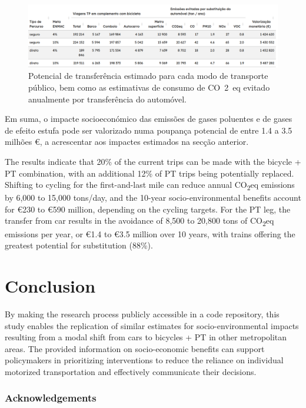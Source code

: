 \documentclass[runningheads]{llncs}
\begin{document}
\begin{figure}
\includegraphics[width=1\linewidth,]{img/table2} \caption{Potencial de transferência estimado para cada modo de transporte público, bem como as estimativas de consumo de CO~2~eq evitado anualmente por transferência do automóvel.}\label{fig:summary2}
\end{figure}

Em suma, o impacte socioeconómico das emissões de gases poluentes e de
gases de efeito estufa pode ser valorizado numa poupança potencial de
entre 1.4 a 3.5 milhões €, a acrescentar aos impactes estimados na
secção anterior.

The results indicate that 20\% of the current trips can be made with the
bicycle + PT combination, with an additional 12\% of PT trips being
potentially replaced. Shifting to cycling for the first-and-last mile
can reduce annual CO\textsubscript{2}eq emissions by 6,000 to 15,000
tons/day, and the 10-year socio-environmental benefits account for €230
to €590 million, depending on the cycling targets. For the PT leg, the
transfer from car results in the avoidance of 8,500 to 20,800 tons of
CO\textsubscript{2}eq emissions per year, or €1.4 to €3.5 million over
10 years, with trains offering the greatest potential for substitution
(88\%).

\hypertarget{conclusion}{%
\section{Conclusion}\label{conclusion}}

By making the research process publicly accessible in a code repository,
this study enables the replication of similar estimates for
socio-environmental impacts resulting from a modal shift from cars to
bicycles + PT in other metropolitan areas. The provided information on
socio-economic benefits can support policymakers in prioritizing
interventions to reduce the reliance on individual motorized
transportation and effectively communicate their decisions.

\hypertarget{acknowledgements}{%
\subsubsection*{Acknowledgements}\label{acknowledgements}}
\end{document}

